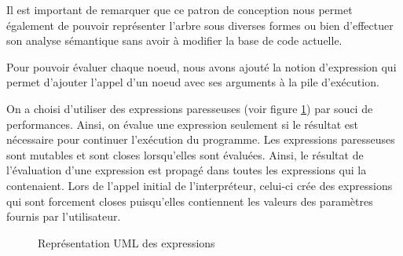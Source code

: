 \documentclass[a4paper, 11pt]{article}
\begin{document}
Il est important de remarquer que ce patron de conception nous permet 
également de pouvoir représenter l'arbre
sous diverses formes ou bien d'effectuer son analyse sémantique 
sans avoir à modifier la base de code actuelle.

Pour pouvoir évaluer chaque noeud, nous avons ajouté la notion d'expression
qui permet d'ajouter l'appel d'un noeud avec ses arguments à la pile d'exécution.

On a choisi d'utiliser des expressions paresseuses (voir figure \ref{fig:uml expressions}) 
par souci de performances. Ainsi, on évalue une expression seulement si le résultat
est nécessaire pour continuer l'exécution du programme. Les expressions paresseuses 
sont mutables et sont closes lorsqu'elles sont évaluées. Ainsi, le résultat de 
l'évaluation d'une expression est propagé dans toutes les expressions qui la contenaient.
Lors de l'appel initial de l'interpréteur, celui-ci crée des expressions qui sont forcement 
closes puisqu'elles
contiennent les valeurs des paramètres fournis par l'utilisateur.


\begin{figure}[H]

    \caption{Représentation UML des expressions}
    \label{fig:uml expressions}
\end{figure}
\end{document}
